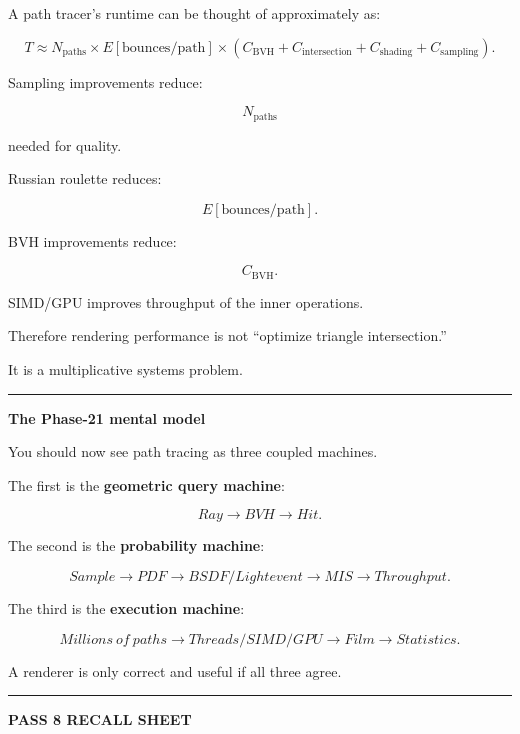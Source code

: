 A path tracer's runtime can be thought of approximately as:

\[
T
\approx
N_{\text{paths}}
\times
E[\text{bounces/path}]
\times
(
C_{\text{BVH}}
+
C_{\text{intersection}}
+
C_{\text{shading}}
+
C_{\text{sampling}}
).
\]

Sampling improvements reduce:

\[
N_{\text{paths}}
\]

needed for quality.

Russian roulette reduces:

\[
E[\text{bounces/path}].
\]

BVH improvements reduce:

\[
C_{\text{BVH}}.
\]

SIMD/GPU improves throughput of the inner operations.

Therefore rendering performance is not ``optimize triangle intersection.''

It is a multiplicative systems problem.

\begin{center}\rule{0.5\linewidth}{0.5pt}\end{center}

\textbf{The Phase-21 mental model}

You should now see path tracing as three coupled machines.

The first is the \textbf{geometric query machine}:

\[
Ray
\rightarrow
BVH
\rightarrow
Hit.
\]

The second is the \textbf{probability machine}:

\[
Sample
\rightarrow
PDF
\rightarrow
BSDF/Light event
\rightarrow
MIS
\rightarrow
Throughput.
\]

The third is the \textbf{execution machine}:

\[
Millions\ of\ paths
\rightarrow
Threads/SIMD/GPU
\rightarrow
Film
\rightarrow
Statistics.
\]

A renderer is only correct and useful if all three agree.

\begin{center}\rule{0.5\linewidth}{0.5pt}\end{center}

\textbf{PASS 8 RECALL SHEET}

